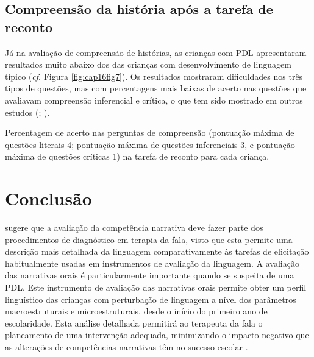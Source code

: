 \documentclass[output=paper,colorlinks,citecolor=brown,booklanguage=portuguese]{langscibook}
\begin{document}
\subsection{Compreensão da história após a tarefa de reconto}
Já na avaliação de compreensão de histórias, as crianças com PDL apresentaram resultados muito abaixo dos das crianças com desenvolvimento de linguagem típico (\emph{cf}. Figura \ref{fig:cap16fig7}). Os resultados mostraram dificuldades nos três tipos de questões, mas com percentagens mais baixas de acerto nas questões que avaliavam compreensão inferencial e crítica, o que tem sido mostrado em outros estudos (\citealp{Cunha2013, Viana2010, Westby2005, Giasson2005, Gillam2018, Favot2020}; ).
\begin{Figura}
            \dataset


    \caption{{Percentagem de acerto nas perguntas de compreensão (pontuação máxima de questões literais 4; pontuação máxima de questões inferenciais 3, e pontuação máxima de questões críticas 1) na tarefa de reconto para cada criança.}}
    \label{fig:cap16fig7}
\end{Figura}

\section{Conclusão}\label{sec:oitocap16}
\citet{Paul2007} sugere que a avaliação da competência narrativa deve fazer parte dos procedimentos de diagnóstico em terapia da fala, visto que esta permite uma descrição mais detalhada da linguagem comparativamente às tarefas de elicitação habitualmente usadas em instrumentos de avaliação da linguagem. A avaliação das narrativas orais é particularmente importante quando se suspeita de uma PDL. Este instrumento de avaliação das narrativas orais permite obter um perfil linguístico das crianças com perturbação de linguagem a nível dos parâmetros macroestruturais e microestruturais, desde o início do primeiro ano de escolaridade. Esta análise detalhada permitirá ao terapeuta da fala o planeamento de uma intervenção adequada, minimizando o impacto negativo que as alterações de competências narrativas têm no sucesso escolar \citep{Gillam2018}. 
\end{document}
